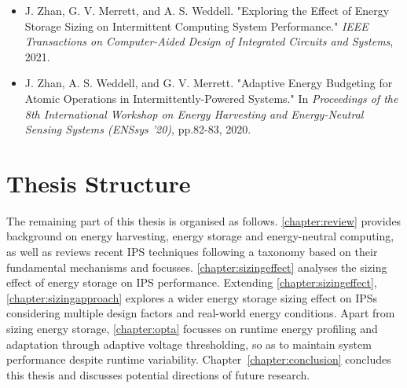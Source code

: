 \begin{itemize}
    \item J. Zhan, G. V. Merrett, and A. S. Weddell. "Exploring the Effect of Energy Storage Sizing on Intermittent Computing System Performance." \textit{IEEE Transactions on Computer-Aided Design of Integrated Circuits and Systems}, 2021.~\cite{zhan2021exploring}

    \item J. Zhan, A. S. Weddell, and G. V. Merrett. "Adaptive Energy Budgeting for Atomic Operations in Intermittently-Powered Systems." In \textit{Proceedings of the 8th International Workshop on Energy Harvesting and Energy-Neutral Sensing Systems (ENSsys '20)}, pp.82-83, 2020.~\cite{zhan2020adaptive}
\end{itemize}


\section{Thesis Structure}

The remaining part of this thesis is organised as follows. 
\cref{chapter:review} provides background on energy harvesting, energy storage and energy-neutral computing, as well as reviews recent IPS techniques following a taxonomy based on their fundamental mechanisms and focusses.
\cref{chapter:sizingeffect} analyses the sizing effect of energy storage on IPS performance.
Extending \cref{chapter:sizingeffect}, \cref{chapter:sizingapproach} explores a wider energy storage sizing effect on IPSs considering multiple design factors and real-world energy conditions. 
Apart from sizing energy storage, \cref{chapter:opta} focusses on runtime energy profiling and adaptation through adaptive voltage thresholding, so as to maintain system performance despite runtime variability.
Chapter~\ref{chapter:conclusion} concludes this thesis and discusses potential directions of future research. 